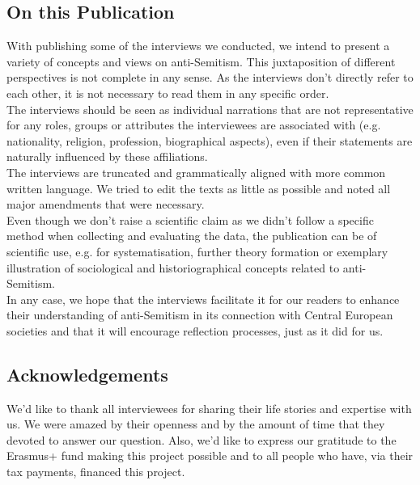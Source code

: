 \subsection*{On this Publication}
With publishing some of the interviews we conducted, we intend to present a variety of concepts and views on anti-Semitism. This juxtaposition of different perspectives is not complete in any sense. As the interviews don’t directly refer to each other, it is not necessary to read them in any specific order.\\ 
The interviews should be seen as individual narrations that are not representative for any roles, groups or attributes the interviewees are associated with (e.g. nationality, religion, profession, biographical aspects), even if their statements are naturally influenced by these affiliations. \\
The interviews are truncated and grammatically aligned with more common written language. We tried to edit the texts as little as possible and noted all major amendments that were necessary. \\
Even though we don’t raise a scientific claim as we didn’t follow a specific method when collecting and evaluating the data, the publication can be of scientific use, e.g. for systematisation, further theory formation or exemplary illustration of sociological and historiographical concepts related to anti-Semitism. \\
In any case, we hope that the interviews facilitate it for our readers to enhance their understanding of anti-Semitism in its connection with Central European societies and that it will encourage reflection processes, just as it did for us. 
\subsection*{Acknowledgements}
We’d like to thank all interviewees for sharing their life stories and expertise with us. We were amazed by their openness and by the amount of time that they devoted to answer our question. Also, we'd like to express our gratitude to the Erasmus+ fund making this project possible and to all people who have, via their tax payments, financed this project.

